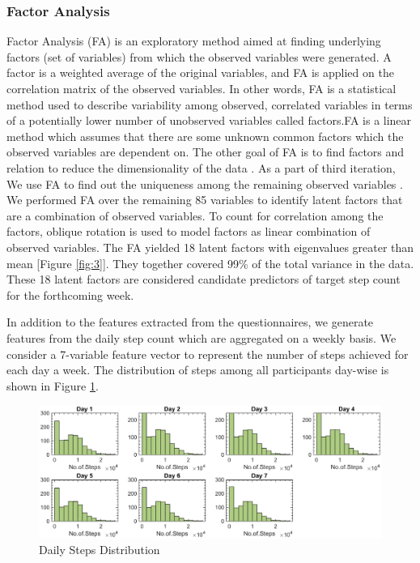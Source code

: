 \documentclass[preprint,12pt]{elsarticle}
\begin{document}
\subsubsection{Factor Analysis}
Factor Analysis (FA) is an exploratory method aimed at finding underlying factors (set of variables) from which the observed variables were generated. A factor is a weighted average of the original variables, and FA is applied on the correlation matrix of the observed variables. In other words, FA is a statistical method used to describe variability among observed, correlated variables in terms of a potentially lower number of unobserved variables called factors.FA is a linear method which assumes that there are some unknown common factors which the observed variables are dependent on. The other goal of FA is to find factors and relation to reduce the dimensionality of the data \cite{fodor2002survey}. As a part of third iteration, We use FA to find out the uniqueness among the remaining observed variables \cite{thompson2007exploratory}.   We performed FA over the remaining 85 variables to identify latent factors that are a combination of observed variables. To count for correlation among the factors, oblique rotation is used to model factors as linear combination of observed variables. The FA yielded 18 latent factors with eigenvalues greater than mean [Figure \ref{fig:3}]. They together covered 99\% of the total variance in the data. These 18 latent factors are considered candidate predictors of target step count for the forthcoming week.


In addition to the features extracted from the questionnaires, we generate features from the daily step count which are aggregated on a weekly basis. We consider a 7-variable feature vector to represent the number of steps achieved for each day a week. The distribution of steps among all participants day-wise is shown in Figure \ref{fig:4}.


\begin{figure}[H]
\centering
  \includegraphics[width=1.1\linewidth]{7dayhist.eps}
    \caption{Daily Steps Distribution}
  \label{fig:4}
\end{figure}
\end{document}
